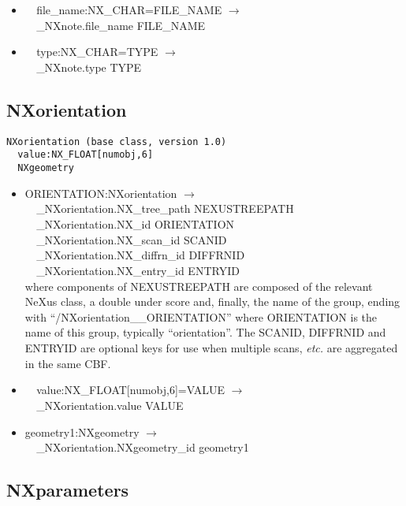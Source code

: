 \documentclass[11pt]{article}
\begin{document}
{{\begin{itemize}
\item{\verb|  |file\_name:NX\_CHAR=FILE\_NAME $\rightarrow$\\
\verb|  |\_NXnote.file\_name FILE\_NAME}

\item{\verb|  |type:NX\_CHAR=TYPE $\rightarrow$\\
\verb|  |\_NXnote.type TYPE}
\end{itemize}
\subsection{NXorientation}

\begin{verbatim}
NXorientation (base class, version 1.0)
  value:NX_FLOAT[numobj,6]
  NXgeometry
\end{verbatim}

\begin{itemize}

\item{ORIENTATION:NXorientation $\rightarrow$\\
\verb|  |\_NXorientation.NX\_tree\_path    NEXUSTREEPATH \\
\verb|  |\_NXorientation.NX\_id            ORIENTATION\\
\verb|  |\_NXorientation.NX\_scan\_id      SCANID \\
\verb|  |\_NXorientation.NX\_diffrn\_id    DIFFRNID \\
\verb|  |\_NXorientation.NX\_entry\_id     ENTRYID \\
where components of NEXUSTREEPATH are composed of the
relevant NeXus class, a double under score and, finally, the
name of the group, ending with ``/NXorientation\_\_ORIENTATION''
where ORIENTATION is the name of this group, typically ``orientation''.
The SCANID, DIFFRNID and ENTRYID are optional keys for use
when multiple scans, {\it etc.} are aggregated in the same CBF.}

\item{\verb|  |value:NX\_FLOAT[numobj,6]=VALUE $\rightarrow$\\
\verb|  |\_NXorientation.value VALUE}

\item{geometry1:NXgeometry $\rightarrow$\\
\verb|  |\_NXorientation.NXgeometry\_id geometry1}
\end{itemize}
\subsection{NXparameters}

}}
\end{document}
